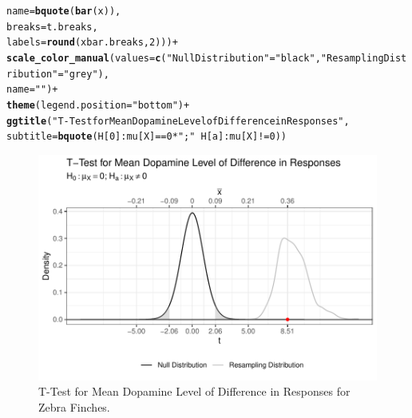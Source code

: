 \documentclass{article}\usepackage[]{graphicx}\usepackage[]{xcolor}
\makeatletter
\def\maxwidth{ %
  \ifdim\Gin@nat@width>\linewidth
    \linewidth
  \else
    \Gin@nat@width
  \fi
}
\newcommand{\hlnum}[1]{\textcolor[rgb]{0.686,0.059,0.569}{#1}}%
\newcommand{\hlsng}[1]{\textcolor[rgb]{0.192,0.494,0.8}{#1}}%
\newcommand{\hlopt}[1]{\textcolor[rgb]{0,0,0}{#1}}%
\newcommand{\hldef}[1]{\textcolor[rgb]{0.345,0.345,0.345}{#1}}%
\newcommand{\hlkwc}[1]{\textcolor[rgb]{0.333,0.667,0.333}{#1}}%
\newcommand{\hlkwd}[1]{\textcolor[rgb]{0.737,0.353,0.396}{\textbf{#1}}}%
\newenvironment{kframe}{%
 \def\at@end@of@kframe{}%
 \ifinner\ifhmode%
  \def\at@end@of@kframe{\end{minipage}}%
  \begin{minipage}{\columnwidth}%
 \fi\fi%
 \def\FrameCommand##1{\hskip\@totalleftmargin \hskip-\fboxsep
 \colorbox{shadecolor}{##1}\hskip-\fboxsep
     \hskip-\linewidth \hskip-\@totalleftmargin \hskip\columnwidth}%
 \MakeFramed {\advance\hsize-\width
   \@totalleftmargin\z@ \linewidth\hsize
   \@setminipage}}%
 {\par\unskip\endMakeFramed%
 \at@end@of@kframe}
\newenvironment{knitrout}{}{} %
\makeatother
\begin{document}
\begin{enumerate}
\begin{enumerate}
\begin{knitrout}
\begin{kframe}
\begin{alltt}
                                       \hlkwc{name} \hldef{=} \hlkwd{bquote}\hldef{(}\hlkwd{bar}\hldef{(x)),}
                                       \hlkwc{breaks} \hldef{= t.breaks,}
                                       \hlkwc{labels} \hldef{=} \hlkwd{round}\hldef{(xbar.breaks,}\hlnum{2}\hldef{)))}\hlopt{+}
\hlkwd{scale_color_manual}\hldef{(}\hlkwc{values} \hldef{=} \hlkwd{c}\hldef{(}\hlsng{"Null Distribution"} \hldef{=} \hlsng{"black"}\hldef{,} \hlsng{"Resampling Distribution"} \hldef{=} \hlsng{"grey"}\hldef{),}
                   \hlkwc{name} \hldef{=} \hlsng{""}\hldef{)} \hlopt{+}
\hlkwd{theme}\hldef{(}\hlkwc{legend.position} \hldef{=} \hlsng{"bottom"}\hldef{)}\hlopt{+}
\hlkwd{ggtitle}\hldef{(}\hlsng{"T-Test for Mean Dopamine Level of Difference in Responses"}\hldef{,}
        \hlkwc{subtitle}\hldef{=}\hlkwd{bquote}\hldef{(H[}\hlnum{0}\hldef{]}\hlopt{:} \hldef{mu[X]}\hlopt{==}\hlnum{0}\hlopt{*}\hlsng{";"}\hlopt{~}\hldef{H[a]}\hlopt{:} \hldef{mu[X]} \hlopt{!=} \hlnum{0}\hldef{))}
\end{alltt}
\end{kframe}
\end{knitrout}
\begin{figure}[H]
\centering
\begin{knitrout}
\color{fgcolor}
\includegraphics[width=\maxwidth]{figure/unnamed-chunk-21-1} 
\end{knitrout}
\caption{T-Test for Mean Dopamine Level of Difference in Responses for Zebra Finches.}
\end{figure}
\end{enumerate}
\end{enumerate}



\end{document}
